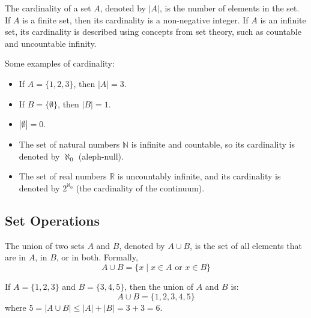 \begin{definition}
    The cardinality of a set $A$, denoted by $|A|$, is the number of elements in the set. If $A$ is a finite set, then its cardinality is a non-negative integer. If $A$ is an infinite set, its cardinality is described using concepts from set theory, such as countable and uncountable infinity.
\end{definition}
\begin{eg}
    Some examples of cardinality:
    \begin{itemize}[itemsep=1pt,label=$\circ$]
        \item If $A = \{1, 2, 3\}$, then $|A| = 3$.
        \item If $B = \{\emptyset\}$, then $|B| = 1$.
        \item $|\emptyset| = 0$.
        \item The set of natural numbers $\mathbb{N}$ is infinite and countable, so its cardinality is denoted by $\aleph_0$ (aleph-null).
        \item The set of real numbers $\mathbb{R}$ is uncountably infinite, and its cardinality is denoted by $2^{\aleph_0}$ (the cardinality of the continuum).
    \end{itemize}
\end{eg}

\subsection{Set Operations}
\begin{definition}[Union]
    The union of two sets $A$ and $B$, denoted by $A \cup B$, is the set of all elements that are in $A$, in $B$, or in both. Formally,
    \[ A \cup B = \{x \mid x \in A \text{ or } x \in B\} \]
    \begin{center}
    \end{center}
\end{definition}
\begin{eg}
    If $A = \{1, 2, 3\}$ and $B = \{3, 4, 5\}$, then the union of $A$ and $B$ is:
    \[ A \cup B = \{1, 2, 3, 4, 5\} \]
    where $5 = |A \cup B| \leq |A| + |B| = 3 + 3 = 6$.
\end{eg}

